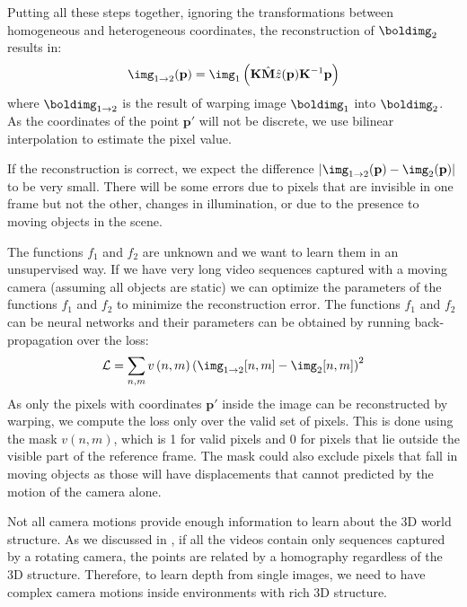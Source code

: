 Putting all these steps together, ignoring the transformations between homogeneous and heterogeneous coordinates, the reconstruction of $\boldimg_2$ results in:
\begin{equation}
\img_{1 \rightarrow 2}(\mathbf{p}) = 
\img_1 \left( \mathbf{K} \hat{\mathbf{M}} \hat{z}(\mathbf{p}) \mathbf{K}^{-1} \mathbf{p} \right)
\end{equation}
where $\boldimg_{1 \rightarrow 2}$ is the result of warping image $\boldimg_1$ into $\boldimg_2$. As the coordinates of the point $\mathbf{p}'$ will not be discrete, we use bilinear interpolation to estimate the pixel value. 


If the reconstruction is correct, we expect the difference $\left| \img_{1 \rightarrow 2}(\mathbf{p}) - \img_{2}(\mathbf{p}) \right|$ to be very small. There will be some errors due to pixels that are invisible in one frame but not the other, changes in illumination, or due to the presence to moving objects in the scene. 

The functions $f_1$ and $f_2$ are unknown and we want to learn them in an unsupervised way. If we have very long video sequences captured with a moving camera (assuming all objects are static) we can optimize the parameters of the functions $f_1$ and $f_2$ to minimize the reconstruction error. The functions $f_1$ and $f_2$ can be neural networks and their parameters can be obtained by running back-propagation over the loss:
\begin{equation}
    \mathcal{L} =  \sum_{n,m} v\left(n,m \right) \left( \img_{1 \rightarrow 2}[n,m] - \img_{2}[n,m] \right) ^2
\end{equation}
As only the pixels with coordinates $\mathbf{p}'$ inside the image can be reconstructed by warping, we compute the loss only over the valid set of pixels. This is done using the mask $v\left(n,m \right)$, which is 1 for valid pixels and 0 for pixels that lie outside the visible part of the reference frame. The mask could also exclude pixels that fall in moving objects as those will have displacements that cannot predicted by the motion of the camera alone. 

Not all camera motions provide enough information to learn about the 3D world structure. As we discussed in \chap{\ref{chapter:homography}}, if all the videos contain only sequences captured by a rotating camera, the points are related by a homography regardless of the 3D structure. Therefore, to learn depth from single images, we need to have complex camera motions inside environments with rich 3D structure.

